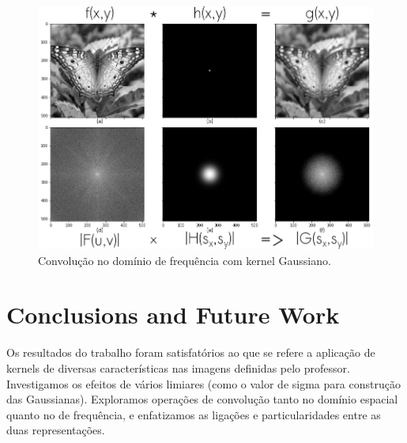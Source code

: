 \documentclass[10pt,twocolumn,letterpaper]{article}
\newcommand{\CITEONE}[2]{\mbox{#1 \cite{#2}}}
\newcommand{\CITETWO}[3]{\mbox{#1 and #2 \cite{#3}}}
\newcommand{\CITEN}[2]{\mbox{#1 et al. \cite{#2}}}
\begin{document}
\begin{figure}[h!]
\begin{center}
	\includegraphics[width=0.99\columnwidth]{pics/ft_complete}
	\caption{Convolução no domínio de frequência com kernel Gaussiano.\label{fig:ft_complete}}   
\end{center} 
\end{figure} 


\section{Conclusions and Future Work}

Os resultados do trabalho foram satisfatórios ao que se refere a aplicação de kernels de diversas características nas imagens definidas pelo professor. Investigamos os efeitos de vários limiares (como o valor de sigma para construção das Gaussianas). Exploramos operações de convolução tanto no domínio espacial quanto no de frequência, e enfatizamos as ligações e particularidades entre as duas representações.


{\small


}
\end{document}
